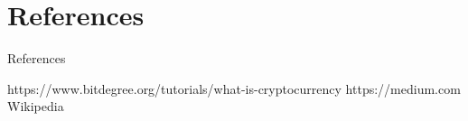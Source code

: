 \documentclass{beamer}
\begin{document}
\section{References}

\begin{frame}{References}
    \begin{thebibliography}{9}
    \bibitem{} https://www.bitdegree.org/tutorials/what-is-cryptocurrency
    \bibitem{} https://medium.com
    \bibitem{} Wikipedia
    \end{thebibliography}
\end{frame}
\end{document}
